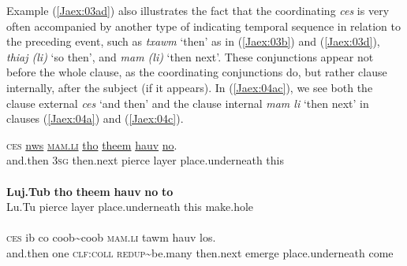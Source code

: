 \documentclass[output=paper]{LSP/langsci}
\begin{document}
Example (\ref{Jaex:03ad}) also illustrates the fact that the coordinating  \textit{ces} is very often accompanied by another type of  indicating temporal sequence in relation to the preceding event, such as \textit{txawm} `then' as in (\ref{Jaex:03b}) and (\ref{Jaex:03d}), \textit{thiaj (li) } `so then', and \textit{mam (li) } `then next'. These  conjunctions appear not before the whole clause, as the coordinating conjunctions do, but rather clause internally, after the subject (if it appears). In (\ref{Jaex:04ac}), we see both the clause external \textit{ces} `and then' and the clause internal \textit{mam li } `then next' in clauses (\ref{Jaex:04a}) and (\ref{Jaex:04c}). 

\begin{exe}
\ex \label{Jaex:04ac}
\begin{xlist}
\ex \label{Jaex:04a}
\gll \textsc{ces} \underline{nws} \underline{\textsc{mam.li}} \underline{tho} \underline{theem} \underline{hauv} \underline{no}.\\
and.then 3\textsc{sg} then.next pierce layer place.underneath this\\
\glt {}\\
\ex \label{Jaex:04b}
\gll \textbf{Luj.Tub} \textbf{tho} \textbf{theem} \textbf{hauv} \textbf{no} \textbf{to}\\
Lu.Tu  pierce layer  place.underneath  this make.hole\\ 
\glt {}\\
\ex \label{Jaex:04c}
\gll \textsc{ces} ib co coob{\textasciitilde}coob \textsc{mam.li} tawm hauv los.\\     	      
     and.then one \textsc{clf:coll} \textsc{redup}{\textasciitilde}be.many then.next emerge place.underneath come\\
\glt {} \citep[][12]{johnson92}
\end{xlist}
\end{exe}
\end{document}
